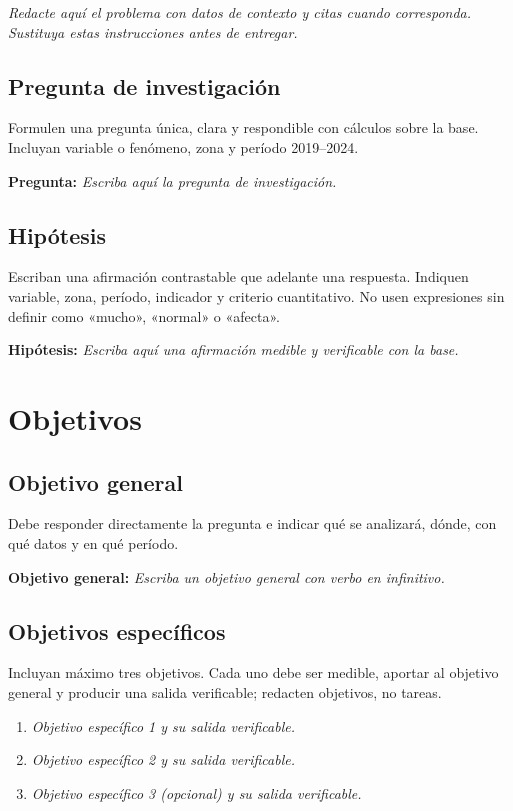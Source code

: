\documentclass[11pt,a4paper]{article}
\newcommand{\completar}[1]{\textit{\textcolor{gris}{#1}}}
\begin{document}
\completar{Redacte aquí el problema con datos de contexto y citas cuando corresponda. Sustituya estas instrucciones antes de entregar.}

\subsection{Pregunta de investigación}
Formulen una pregunta única, clara y respondible con cálculos sobre la base. Incluyan variable o fenómeno, zona y período 2019--2024.

\textbf{Pregunta:} \completar{Escriba aquí la pregunta de investigación.}

\subsection{Hipótesis}
Escriban una afirmación contrastable que adelante una respuesta. Indiquen variable, zona, período, indicador y criterio cuantitativo. No usen expresiones sin definir como «mucho», «normal» o «afecta».

\textbf{Hipótesis:} \completar{Escriba aquí una afirmación medible y verificable con la base.}

\section{Objetivos}
\subsection{Objetivo general}
Debe responder directamente la pregunta e indicar qué se analizará, dónde, con qué datos y en qué período.

\textbf{Objetivo general:} \completar{Escriba un objetivo general con verbo en infinitivo.}

\subsection{Objetivos específicos}
Incluyan máximo tres objetivos. Cada uno debe ser medible, aportar al objetivo general y producir una salida verificable; redacten objetivos, no tareas.
\begin{enumerate}
  \item \completar{Objetivo específico 1 y su salida verificable.}
  \item \completar{Objetivo específico 2 y su salida verificable.}
  \item \completar{Objetivo específico 3 (opcional) y su salida verificable.}
\end{enumerate}
\end{document}
